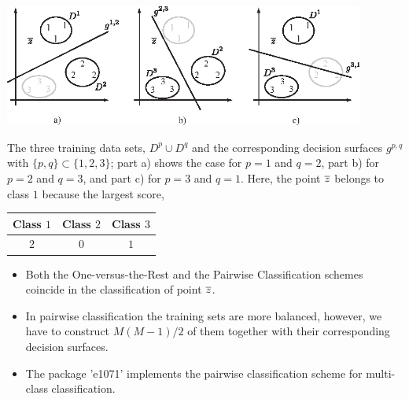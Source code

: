 \documentclass[a4paper,blends,pdf,colorBG,slideColor]{prosper}
\begin{document}
\begin{center}
\includegraphics[height=40mm]{figures/fig11-03.eps}
\end{center}
The three training data sets, $D^{p}\cup D^q$ 
and the corresponding decision surfaces $g^{p,q}$ with $\{p,q\} \subset \{1,2,3\}$;
part a) shows the case for $p=1$ and $q=2$, part b) 
for $p=2$ and $q=3$, and part c) for $p=3$ and $q=1$.   Here, the point $\overline{z}$ belongs to class $1$ because the largest score,
\begin{center}
   \begin{tabular}{ccc}
  Class $1$ & Class $2$ & Class $3$ \\
     \midrule
      $2$     & $0$ & $1$ \\ 
   \end{tabular}
\end{center}

\es

\begin{itemize}
\item
Both the One-versus-the-Rest and the Pairwise Classification schemes coincide in the classification
of point $\overline{z}$.

\item
In pairwise classification the training sets are more balanced, however, we have to construct $M(M-1)/2$
of them together with their corresponding decision surfaces.

\item 
The package 'e1071' implements the pairwise classification scheme for multi-class classification.
\end{itemize}
\es
\end{document}
